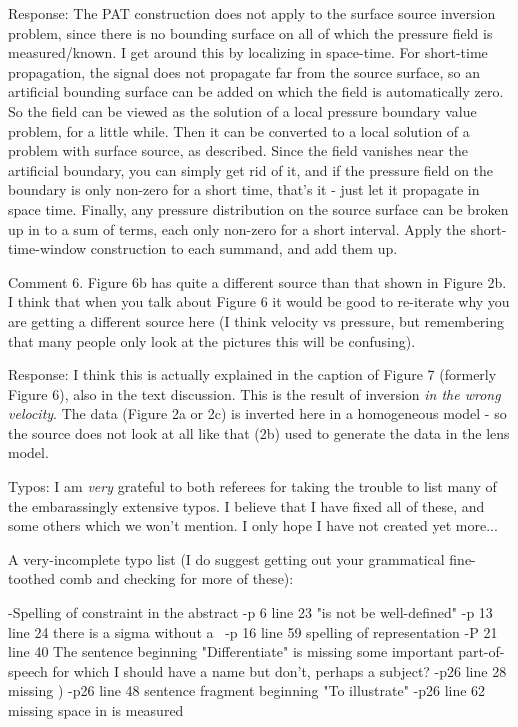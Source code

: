Response: The PAT construction does not apply to the surface source inversion problem, since there is no bounding surface on all of which the pressure field is measured/known. I get around this by localizing in space-time. For short-time propagation, the signal does not propagate far from the source surface, so an artificial bounding surface can be added on which the field is automatically zero. So the field can be viewed as the solution of a local pressure boundary value problem, for a little while. Then it can be converted to a local solution of a problem with surface source, as described. Since the field vanishes near the artificial boundary, you can simply get rid of it, and if the pressure field on the boundary is only non-zero for a short time, that's it - just let it propagate in space time. Finally, any pressure distribution on the source surface can be broken up in to a sum of terms, each only non-zero for a short interval. Apply the short-time-window construction to each summand, and add them up.

Comment 6. Figure 6b has quite a different source than that shown in Figure 2b.  I think that when you talk about Figure 6 it would be good to re-iterate why you are getting a different source here (I think velocity vs pressure, but remembering that many people only look at the pictures this will be confusing).

Response: I think this is actually explained in the caption of Figure 7 (formerly Figure 6), also in the text discussion. This is the result of inversion {\em in the wrong velocity}. The data (Figure 2a or 2c) is inverted here in a homogeneous model - so the source does not look at all like that (2b) used to generate the data in the lens model.

Typos: I am {\em very} grateful to both referees for taking the trouble to list many of the embarassingly extensive typos. I believe that I have fixed all of these, and some others which we won't mention. I only hope I have not created yet more...


A very-incomplete typo list (I do suggest getting out your grammatical fine-toothed comb and checking for more of these): 

-Spelling of constraint in the abstract
-p 6 line 23 "is not be well-defined"
-p 13 line 24 there is a sigma without a \
-p 16 line 59 spelling of representation
-P 21 line 40 The sentence beginning "Differentiate" is missing some important part-of-speech for which I should have a name but don't, perhaps a subject?
-p26 line 28 missing )
-p26 line 48 sentence fragment beginning "To illustrate"
-p26 line 62 missing space in is measured



